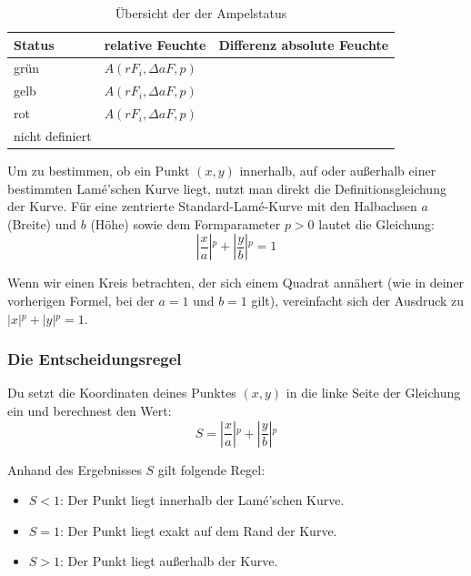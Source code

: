 \begin{table}[htbp]
    \centering
    \caption{Übersicht der der Ampelstatus} %
    \label{tab:ampelstatus}                  %
    \begin{tabular}{lll}
        \toprule
        Status & relative Feuchte & Differenz absolute Feuchte \\
        \midrule
        grün  &  $A(rF_i, \Delta aF, p) $       &   \\ \addlinespace 
        gelb  &  $A(rF_i, \Delta aF, p) $       &   \\ \addlinespace
        rot   &  $A(rF_i, \Delta aF, p) $       &   \\ \addlinespace
        nicht definiert &                       &  \\  \bottomrule
    \end{tabular}
\end{table}





Um zu bestimmen, ob ein Punkt \((x, y)\) innerhalb, auf oder außerhalb einer bestimmten Lamé'schen Kurve liegt, nutzt man direkt die Definitionsgleichung der Kurve.
Für eine zentrierte Standard-Lamé-Kurve mit den Halbachsen \(a\) (Breite) und \(b\) (Höhe) sowie dem Formparameter \(p > 0\) lautet die Gleichung:
\begin{equation}
    \left|{}\frac{x}{a}\right|{}^{p}+\left|{}\frac{y}{b}\right|{}^{p}=1
\end{equation}

Wenn wir einen Kreis betrachten, der sich einem Quadrat annähert (wie in deiner vorherigen Formel, bei der \(a = 1\) und \(b = 1\) gilt), vereinfacht sich der Ausdruck zu \(\left\vert{} x \right\vert{}^p + \left\vert{} y \right\vert{}^p = 1\).



\subsubsection{Die Entscheidungsregel}

Du setzt die Koordinaten deines Punktes \((x, y)\) in die linke Seite der Gleichung ein und berechnest den Wert:
\begin{equation}
    S = \left|{}\frac{x}{a}\right|{}^{p}+\left|{}\frac{y}{b}\right|{}^{p}
\end{equation}

Anhand des Ergebnisses \(S\) gilt folgende Regel:
\begin{itemize}
    \item \(S < 1\): Der Punkt liegt innerhalb der Lamé'schen Kurve.
    \item \(S = 1\): Der Punkt liegt exakt auf dem Rand der Kurve.
    \item \(S > 1\): Der Punkt liegt außerhalb der Kurve.
\end{itemize}

